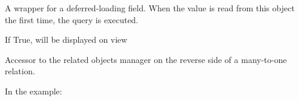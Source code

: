 \documentclass[letterpaper,10pt,english]{sphinxmanual}
\begin{document}
\begin{fulllineitems}
\begin{fulllineitems}
\label{\detokenize{modules/models:gestion.models.Keg.history}}
\end{fulllineitems}


\begin{fulllineitems}
\label{\detokenize{modules/models:gestion.models.Keg.id}}
A wrapper for a deferred-loading field. When the value is read from this
object the first time, the query is executed.

\end{fulllineitems}


\begin{fulllineitems}
\label{\detokenize{modules/models:gestion.models.Keg.is_active}}
If True, will be displayed on {\hyperref[\detokenize{modules/views:gestion.views.manage}]{}} view

\end{fulllineitems}


\begin{fulllineitems}
\label{\detokenize{modules/models:gestion.models.Keg.keghistory_set}}
Accessor to the related objects manager on the reverse side of a
many-to-one relation.

In the example:

\begin{sphinxVerbatim}[commandchars=\\\{\}]
 
       
\end{sphinxVerbatim}


\end{fulllineitems}
\end{fulllineitems}
\end{document}
